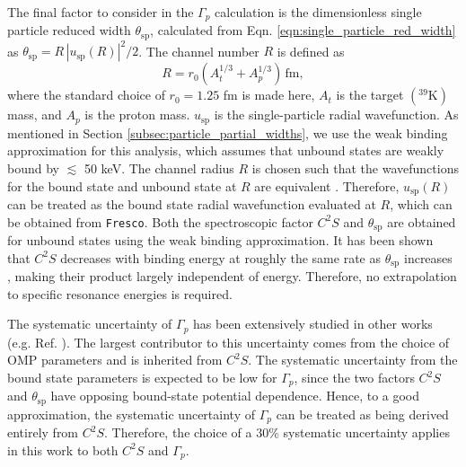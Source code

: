 The final factor to consider in the $\Gamma_{p}$ calculation is the dimensionless single particle reduced width $\theta_{\mathrm{sp}}$, calculated from Eqn. \ref{eqn:single_particle_red_width} as $\theta_{\mathrm{sp}} = R \, |u_{\mathrm{sp}}(R)|^{2}/2$. The channel number $R$ is defined as
\begin{equation}
R = r_{0} (A^{1/3}_{t} + A^{1/3}_{p}) \, \mathrm{fm},
\end{equation}
where the standard choice of $r_{0} = 1.25$ fm is made here, $A_{t}$ is the target $(^{39}\mathrm{K})$ mass, and $A_{p}$ is the proton mass. $u_{\mathrm{sp}}$ is the single-particle radial wavefunction. As mentioned in Section \ref{subsec:particle_partial_widths}, we use the weak binding approximation for this analysis, which assumes that unbound states are weakly bound by $\lesssim$ 50 keV. The channel radius $R$ is chosen such that the wavefunctions for the bound state and unbound state at $R$ are equivalent \cite{Harrouz2023}. Therefore, $u_{\mathrm{sp}}(R)$ can be treated as the bound state radial wavefunction evaluated at $R$, which can be obtained from \texttt{Fresco}. Both the spectroscopic factor $C^{2}S$ and $\theta_{\mathrm{sp}}$ are obtained for unbound states using the weak binding approximation. It has been shown that $C^{2}S$ decreases with binding energy at roughly the same rate as $\theta_{\mathrm{sp}}$ increases \cite{Harrouz2023}, making their product largely independent of energy. Therefore, no extrapolation to specific resonance energies is required.

The systematic uncertainty of $\Gamma_{p}$ has been extensively studied in other works (e.g. Ref. \cite{Hale2004}). The largest contributor to this uncertainty comes from the choice of OMP parameters and is inherited from $C^{2}S$. The systematic uncertainty from the bound state parameters is expected to be low for $\Gamma_{p}$, since the two factors $C^{2}S$ and $\theta_{\mathrm{sp}}$ have opposing bound-state potential dependence. Hence, to a good approximation, the systematic uncertainty of $\Gamma_{p}$ can be treated as being derived entirely from $C^{2}S$. Therefore, the choice of a $30\%$ systematic uncertainty applies in this work to both $C^{2}S$ and $\Gamma_{p}$.

\begingroup %
  \renewcommand*{\thefootnote}{\alph{footnote}}
  \renewcommand*\footnoterule{} %

